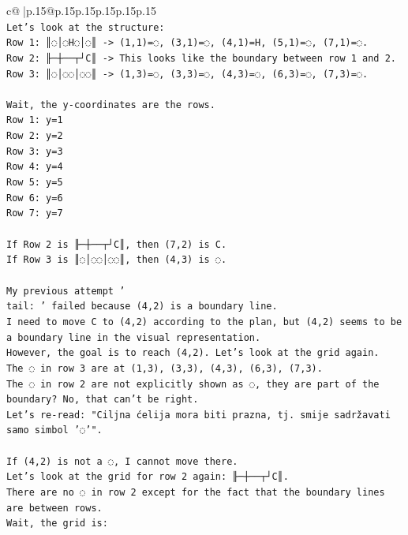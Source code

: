 \documentclass{article}
\begin{document}
{\begin{supertabular}{c@{$\;$}|p{.15\linewidth}@{}p{.15\linewidth}p{.15\linewidth}p{.15\linewidth}p{.15\linewidth}p{.15\linewidth}}
{{{\\ 
\texttt{Let's look at the structure:} \\
\texttt{Row 1: ║◌│◌H◌│◌║ {-}> (1,1)=◌, (3,1)=◌, (4,1)=H, (5,1)=◌, (7,1)=◌.} \\
\texttt{Row 2: ╟─┼──┬┘C║ {-}> This looks like the boundary between row 1 and 2.} \\
\texttt{Row 3: ║◌│◌◌│◌◌║ {-}> (1,3)=◌, (3,3)=◌, (4,3)=◌, (6,3)=◌, (7,3)=◌.} \\
\\ 
\texttt{Wait, the y{-}coordinates are the rows.} \\
\texttt{Row 1: y=1} \\
\texttt{Row 2: y=2} \\
\texttt{Row 3: y=3} \\
\texttt{Row 4: y=4} \\
\texttt{Row 5: y=5} \\
\texttt{Row 6: y=6} \\
\texttt{Row 7: y=7} \\
\\ 
\texttt{If Row 2 is ╟─┼──┬┘C║, then (7,2) is C.} \\
\texttt{If Row 3 is ║◌│◌◌│◌◌║, then (4,3) is ◌.} \\
\\ 
\texttt{My previous attempt '} \\
\texttt{tail: ' failed because (4,2) is a boundary line.} \\
\texttt{I need to move C to (4,2) according to the plan, but (4,2) seems to be a boundary line in the visual representation.} \\
\texttt{However, the goal is to reach (4,2). Let's look at the grid again.} \\
\texttt{The ◌ in row 3 are at (1,3), (3,3), (4,3), (6,3), (7,3).} \\
\texttt{The ◌ in row 2 are not explicitly shown as ◌, they are part of the boundary? No, that can't be right.} \\
\texttt{Let's re{-}read: "Ciljna ćelija mora biti prazna, tj. smije sadržavati samo simbol '◌'".} \\
\\ 
\texttt{If (4,2) is not a ◌, I cannot move there.} \\
\texttt{Let's look at the grid for row 2 again: ╟─┼──┬┘C║.} \\
\texttt{There are no ◌ in row 2 except for the fact that the boundary lines are between rows.} \\
\texttt{Wait, the grid is:} \\
}}}
\end{supertabular}}
\end{document}
